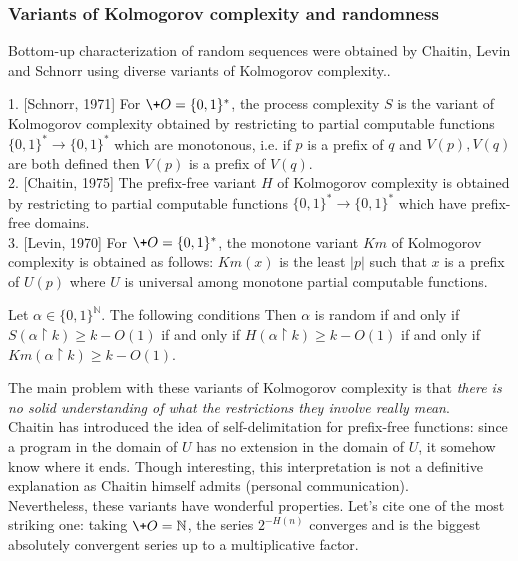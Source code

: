 \subsubsection{Variants of Kolmogorov complexity and randomness}
Bottom-up characterization of random sequences were
obtained by Chaitin, Levin  and Schnorr using diverse
variants of Kolmogorov complexity..
\begin{definition}\label{def:SH}
1. [Schnorr, \cite{schnorr71} 1971]
For $\+O={\{0,1\}^*}$, the process complexity $S$ is the variant of
Kolmogorov complexity obtained by restricting to partial computable
functions ${\{0,1\}^*}\to{\{0,1\}^*}$ which are monotonous,
i.e. if $p$ is a prefix of $q$ and $V(p), V(q)$ are both defined
then $V(p)$ is a prefix of $V(q)$.
\medskip\\
2. [Chaitin, \cite{chaitin75} 1975]
The prefix-free variant $H$ of Kolmogorov
complexity is obtained by restricting to partial computable
functions ${\{0,1\}^*}\to{\{0,1\}^*}$ which have prefix-free domains.
\medskip\\
3. [Levin, \cite{zvonkin-levin} 1970]
For $\+O={\{0,1\}^*}$, the monotone variant $Km$ of Kolmogorov
complexity is obtained as follows:
$Km(x)$ is the least $|p|$ such that $x$ is a prefix of $U(p)$
where $U$ is universal among monotone partial computable functions.
\end{definition}
\begin{theorem}\label{thm:HS}
Let $\alpha\in{\{0,1\}^{\mathbb N}}$. The following conditions
Then $\alpha$ is random
if and only if $S(\alpha{\!\upharpoonright \!} k) \geq k -O(1)$
if and only if $H(\alpha{\!\upharpoonright \!} k) \geq k -O(1)$
if and only if $Km(\alpha{\!\upharpoonright \!} k) \geq k -O(1)$.
\end{theorem}
The main problem with these variants of Kolmogorov complexity
is that {\em there is no solid understanding of what the restrictions
they involve really mean}.
\\
Chaitin has introduced the idea of self-delimitation for prefix-free
functions: since a program in the domain of $U$ has no extension
in the domain of $U$, it somehow know where it ends.
Though interesting, this interpretation is not a definitive
explanation as Chaitin himself admits (personal communication).
\\
Nevertheless, these variants have wonderful properties.
Let's cite one of the most striking one:
taking $\+O={\mathbb N}$, the series $2^{-H(n)}$ converges and is the biggest
absolutely convergent series up to a multiplicative factor.
